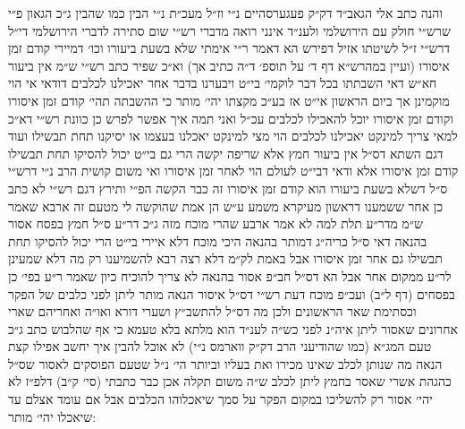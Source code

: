 \documentclass[12pt, openany]{book}
\begin{document}
\begin{multicols}{2}
והנה כתב אלי הגאב״ד דק״ק פעגערסהיים נ״י וז״ל מעכ״ת נ״י הבין כמו שהבין ג״כ הגאון פ״י שרש״י חולק עם הירושלמי ולענ״ד אינני רואה מדברי רש״י שום סתירה לדברי הירושלמי די״ל דרש״י ז״ל לשיטתו אזיל דפירש הא דאמר ר״י אימתי שלא בשעת ביעורו וכו׳ דמיירי קודם זמן איסורו (ועיין במהרש״א דף ד׳ על תוספ׳ ד״ה כתיב אך) וא״כ שפיר כתב רש״י ש״מ אין ביעור חא״ש דאי השבתתו בכל דבר לוקמי׳ בי״ט ויבערנו בדבר אחר יאכילנו לכלבים דודאי אי הוי מוקמינן אך ביום הראשון אי״ט אז בע״כ מקצתו יהי׳ מותר כי ההשבתה תהי׳ קודם זמן איסורו וקודם זמן איסורו יוכל להאכילו לכלבים עכ״ל ואני תמה איך אפשר לפרש כן כוונת רש״י דא״כ למאי צריך למינקט יאכילנו לכלבים הוי מצי למינקט יאכלנו בעצמו או יסיקנו תחת תבשילו ועוד דגם השתא דס״ל אין ביעור חמץ אלא שריפה יקשה הרי גם בי״ט יכול להסיקו תחת תבשילו קודם זמן איסורו אלא ודאי דבי״ט לעולם הוי לאחר זמן איסורו ואי משום קושית הרב נ״י דרש״י ס״ל דשלא בשעת ביעורו הוא קודם זמן איסורו זה כבר הקשה הפ״י ותירץ דגם רש״י לא כתב כן אחר ששמענו דראשון מעיקרא משמע ע״ש הן אמת שהוקשה לי מטעם זה ארבא שאמר ש״מ מדר״ע תלת למה לא אמר ארבע שהרי מוכח מזה ג״כ דר״ע ס״ל חמץ בפסח אסור בהנאה דאי ס״ל כריה״ג דמותר בהנאה היכי מוכח דלא איירי בי״ט הרי יכול להסיקו תחת תבשילו גם אחר זמן איסורו אבל באמת לק״מ דלא רצה רבא להשמיענו רק מה דלא שמעינן לר״ע ממקום אחר אבל הא דס״ל חב״פ אסור בהנאה לא צריך להוכיח כיון שאמר ר״ע בפי׳ כן בפסחים (דף ל״ב) ועכ״פ מוכח דעת רש״י דס״ל איסור הנאה מותר ליתן לפני כלבים של הפקר וכסתימת שאר הראשונים ולכן מה דס״ל להתשב״ץ ושערי דורא ואו״ה ואחריהם שארי אחרונים שאסור ליתן איה״נ לפני כש״ה לענ״ד הוא מלתא בלא טעמא כי אף שהלבוש כתב ג״כ טעם המג״א (כמו שהודיעני הרב דק״ק ווארמס נ״י) לא אוכל להבין איך יחשב אפילו קצת הנאה מה שנותן לכלב שאינו מכירו ואת בעליו וביותר הי׳ נ״ל שטעם הפוסקים לאסור שס״ל כהגהת אשרי שאסר בחמץ ליתן לכלב ש״ה משום תקלה אכן כבר כתבתי (סי׳ ק״ב) דלפ״ז לא יהי׳ אסור רק להשליכו במקום הפקר על סמך שיאכלוהו הכלבים אבל אם עומד אצלם עד שיאכלו יהי׳ מותר:\\\vspace{0pt}


\end{multicols}
\end{document}
